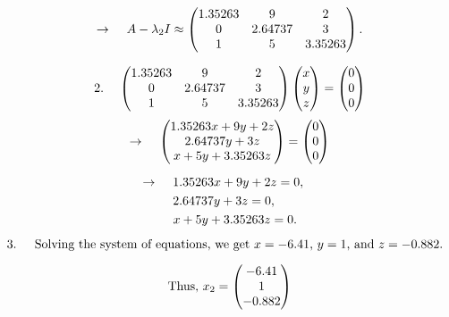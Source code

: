 \documentclass{article}
\begin{document}
\[
\rightarrow \hspace{4mm} A - \lambda_2 I \approx \begin{pmatrix} 1.35263 & 9 & 2 \\ 0 & 2.64737 & 3 \\ 1 & 5 & 3.35263 \end{pmatrix}.
\]

\vspace{2mm}

\[
2. \hspace{4mm} \begin{pmatrix} 1.35263 & 9 & 2 \\ 0 & 2.64737 & 3 \\ 1 & 5 & 3.35263 \end{pmatrix} \begin{pmatrix} x \\ y \\ z \end{pmatrix} = \begin{pmatrix} 0 \\ 0 \\ 0 \end{pmatrix}
\]
\[
\rightarrow \hspace{4mm} \begin{pmatrix} 1.35263 x + 9 y + 2 z \\ 2.64737 y + 3 z \\ x + 5 y + 3.35263 z \end{pmatrix} = \begin{pmatrix} 0 \\ 0 \\ 0 \end{pmatrix}
\]

\[
\hspace{-4mm} \rightarrow \hspace{4mm} 1.35263 x + 9 y + 2 z = 0,
\]
\[
\hspace{-2.5mm} \hspace{-1mm} 2.64737 y + 3 z = 0,
\]
\[
\hspace{-2mm} \hspace{5mm} x + 5 y + 3.35263 z = 0.
\]

\[
\text{\hspace{-4mm} 3. \hspace{2mm} Solving the system of equations, we get \( x = -6.41 \), \( y = 1 \), and \( z = -0.882 \).}
\]

\[
\text{Thus, \( x_2 = \begin{pmatrix} -6.41 \\ 1 \\ -0.882 \end{pmatrix} \)}
\]
\end{document}
